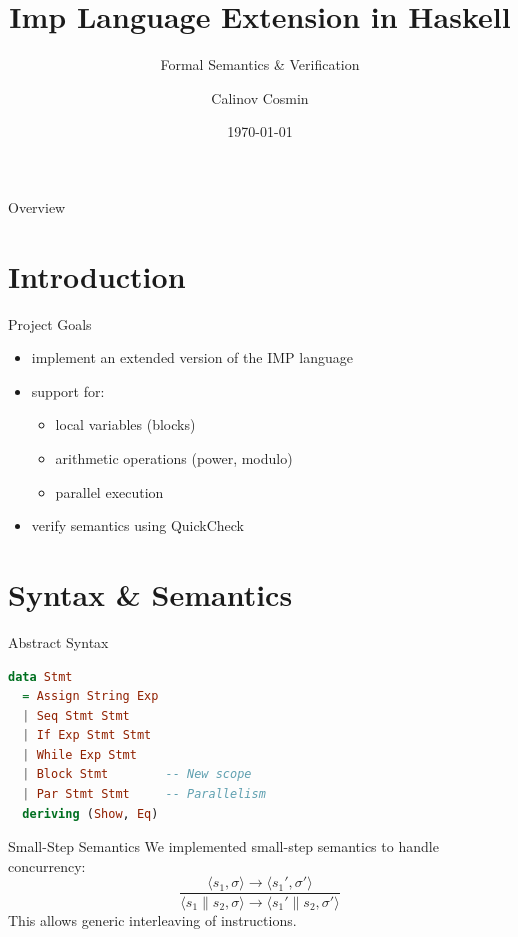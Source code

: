 \documentclass{beamer}
\title{Imp Language Extension in Haskell}
\subtitle{Formal Semantics \& Verification}
\author{Calinov Cosmin}
\date{\today}
\begin{document}
	
	\maketitle
	
	\begin{frame}{Overview}
		\tableofcontents
	\end{frame}

	\section{Introduction}
	\begin{frame}{Project Goals}
		\begin{itemize}
			\item implement an extended version of the IMP language
			\item support for:
			\begin{itemize}
				\item local variables (blocks)
				\item arithmetic operations (power, modulo)
				\item parallel execution
			\end{itemize}
			\item verify semantics using QuickCheck
		\end{itemize}
	\end{frame}

	\section{Syntax \& Semantics}
	\begin{frame}[fragile]{Abstract Syntax}
\begin{lstlisting}[language=Haskell]
data Stmt
  = Assign String Exp
  | Seq Stmt Stmt
  | If Exp Stmt Stmt
  | While Exp Stmt
  | Block Stmt        -- New scope
  | Par Stmt Stmt     -- Parallelism
  deriving (Show, Eq)
\end{lstlisting}
	\end{frame}

	\begin{frame}{Small-Step Semantics}
		We implemented small-step semantics to handle concurrency:
		\[
			\frac{\langle s_1, \sigma \rangle \rightarrow \langle s_1', \sigma' \rangle}
			{\langle s_1 \parallel s_2, \sigma \rangle \rightarrow \langle s_1' \parallel s_2, \sigma' \rangle}
		\]
		This allows generic interleaving of instructions.
	\end{frame}
\end{document}
